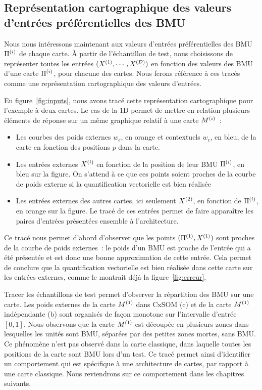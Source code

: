 \documentclass[../main]{subfiles}
\begin{document}
\subsection{Représentation cartographique des valeurs d'entrées préférentielles des BMU}

Nous nous intéressons maintenant aux valeurs d'entrées préférentielles des BMU $\Pi^{({i})}$ de chaque carte.
\`A partir de l'échantillon de test, nous choisissons de représenter toutes les entrées $(X^{({1})}, \cdots, X^{({D})})$ en fonction des valeurs des BMU d'une carte $\Pi^{({i})}$, pour chacune des cartes.
Nous ferons référence à ces tracés comme une représentation cartographique des valeurs d'entrées.

En figure~\ref{fig:inputs}, nous avons tracé cette représentation cartographique pour l'exemple à deux cartes. 
Le cas de la 1D permet de mettre en relation plusieurs éléments de réponse sur un même graphique relatif à une carte $M^{({i})}$~:
\begin{itemize}
    \item Les courbes des poids externes $w_e$, en orange et contextuels $w_c$, en bleu, de la carte en fonction des positions $p$ dans la carte.
    \item Les entrées externes $X^{({i})}$ en fonction de la position de leur BMU $\Pi^{({i})}$, en bleu sur la figure. On s'attend à ce que ces points soient proches de la courbe de poids externe si la quantification vectorielle est bien réalisée
    \item Les entrées externes des autres cartes, ici seulement $X^{({2})}$, en fonction de $\Pi^{({i})}$, en orange sur la figure. Le tracé de ces entrées permet de faire apparaître les paires d'entrées présentées ensemble à l'architecture.
\end{itemize}

Ce tracé nous permet d'abord d'observer que les points $(\Pi^{({1})},X^{({1})})$ sont proches de la courbe de poids externes~: le poids d'un BMU est proche de l'entrée qui a été présentée et est donc une bonne approximation de cette entrée. Cela permet de conclure que la quantification vectorielle est bien réalisée dans cette carte sur les entrées externes, comme le montrait déjà la figure~\ref{fig:erreur}.

Tracer les échantillons de test permet d'observer la répartition des BMU sur une carte. 
Les poids externes de la carte $M^{({1})}$ dans CxSOM (c) et de la carte $M^{({1})}$ indépendante (b) sont organisés de façon monotone sur l'intervalle d'entrée $[0,1]$.
Nous observons que la carte $M^{({1})}$ est découpée en plusieurs zones dans lesquelles les unités sont BMU, séparées par des petites zones mortes, sans BMU. Ce phénomène n'est pas observé dans la carte classique, dans laquelle toutes les positions de la carte sont BMU lors d'un test. 
Ce tracé permet ainsi d'identifier un comportement qui est spécifique à une architecture de cartes, par rapport à une carte classique. Nous reviendrons sur ce comportement dans les chapitres suivants.
\end{document}
